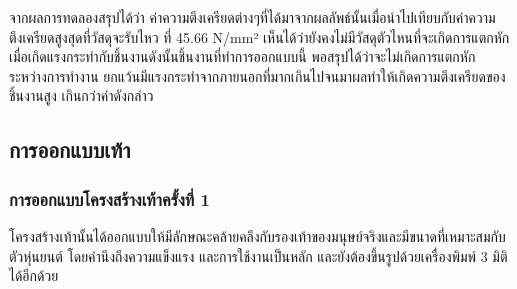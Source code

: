 จากผลการทดลองสรุปได้ว่า ค่าความตึงเครียดต่างๆที่ได้มาจากผลลัพธ์นั้นเมื่อนำไปเทียบกับค่าความตึงเครียดสูงสุดที่วัสดุจะรับไหว
ที่ 45.66 N/mm² เห็นได้ว่ายังคงไม่มีวัสดุตัวไหนที่จะเกิดการแตกหักเมื่อเกิดแรงกระทำกับชิ้นงานดังนั้นชิ้นงานที่ทำการออกแบบนี้
พอสรุปได้ว่าจะไม่เกิดการแตกหักระหว่างการทำงาน ยกแว้นมีแรงกระทำจากภายนอกที่มากเกินไปจนมาผลทำให้เกิดความตึงเครียดของชิ้นงานสูง
เกินกว่าค่าดังกล่าว  

\clearpage
\subsection{การออกแบบเท้า}
\subsubsection{การออกแบบโครงสร้างเท้าครั้งที่ 1}
โครงสร้างเท้านั้นได้ออกแบบให้มีลักษณะคล้ายคลึงกับรองเท้าของมนุษย์จริงและมีขนาดที่เหมาะสมกับตัวหุ่นยนต์ โดยคำนึงถึงความแข็งแรง
และการใช้งานเป็นหลัก และยังต้องขึ้นรูปด้วยเครื่องพิมพ์ 3 มิติได้อีกด้วย
